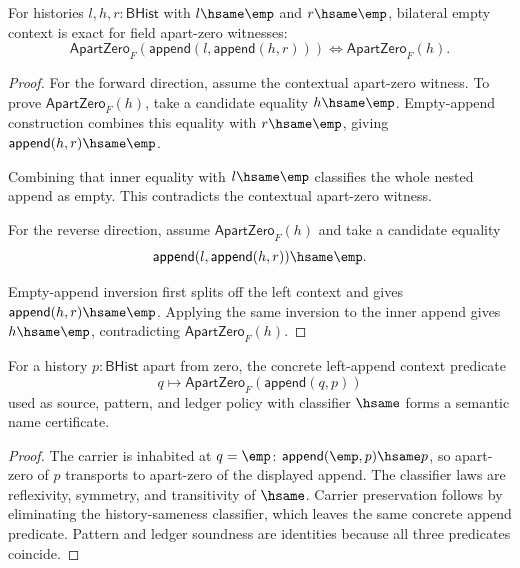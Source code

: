 \begin{theorem}
\label{thm:field-apartzero-empty-context-iff}
For histories $l,h,r:\mathsf{BHist}$ with $l\hsame\emp$ and $r\hsame\emp$,
bilateral empty context is exact for field apart-zero witnesses:
$$
\mathsf{ApartZero}_F(\mathsf{append}(l,\mathsf{append}(h,r)))
\Longleftrightarrow
\mathsf{ApartZero}_F(h).
$$
\end{theorem}
\begin{proof}
For the forward direction, assume the contextual apart-zero witness. To prove
$\mathsf{ApartZero}_F(h)$, take a candidate equality $h\hsame\emp$.
Empty-append construction combines this equality with $r\hsame\emp$, giving
$\mathsf{append}(h,r)\hsame\emp$.

Combining that inner equality with $l\hsame\emp$ classifies the whole nested
append as empty. This contradicts the contextual apart-zero witness.

For the reverse direction, assume $\mathsf{ApartZero}_F(h)$ and take a
candidate equality
$$
\mathsf{append}(l,\mathsf{append}(h,r))\hsame\emp.
$$

Empty-append inversion first splits off the left context and gives
$\mathsf{append}(h,r)\hsame\emp$. Applying the same inversion to the inner
append gives $h\hsame\emp$, contradicting $\mathsf{ApartZero}_F(h)$.
\end{proof}

\begin{theorem}
\label{thm:field-apartzero-append-left-context-semantic-namecert}
For a history $p:\mathsf{BHist}$ apart from zero, the concrete left-append
context predicate
$$
q\longmapsto \mathsf{ApartZero}_F(\mathsf{append}(q,p))
$$
used as source, pattern, and ledger policy with classifier $\hsame$ forms a
semantic name certificate.
\end{theorem}
\begin{proof}
The carrier is inhabited at $q=\emp$: $\mathsf{append}(\emp,p)\hsame p$, so
apart-zero of $p$ transports to apart-zero of the displayed append. The
classifier laws are reflexivity, symmetry, and transitivity of $\hsame$.
Carrier preservation follows by eliminating the history-sameness classifier,
which leaves the same concrete append predicate. Pattern and ledger soundness
are identities because all three predicates coincide.
\end{proof}

